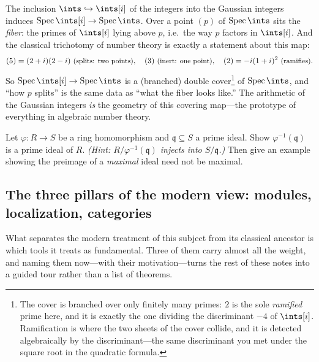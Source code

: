 \documentclass[11pt]{article}
\DeclareMathOperator{\Spec}{Spec}
\newcommand{\mfq}{\mathfrak{q}}
\begin{document}
\begin{eexample}
The inclusion $\ints\hookrightarrow\ints[i]$ of the integers into the Gaussian integers
induces $\Spec\ints[i]\to\Spec\ints$. Over a point $(p)$ of $\Spec\ints$ sits the
\emph{fiber}: the primes of $\ints[i]$ lying above $p$, i.e.\ the way $p$ factors in
$\ints[i]$. And the classical trichotomy of number theory is exactly a statement about this
map:
\[
(5)=(2+i)(2-i)\ \text{\small(splits: two points)},\quad
(3)\ \text{\small(inert: one point)},\quad
(2)=-i(1+i)^2\ \text{\small(ramifies)}.
\]
So $\Spec\ints[i]\to\Spec\ints$ is a (branched) double cover\footnote{The cover is branched
over only finitely many primes: $2$ is the sole \emph{ramified} prime here, and it is exactly
the one dividing the discriminant $-4$ of $\ints[i]$. Ramification is where the two sheets of
the cover collide, and it is detected algebraically by the discriminant---the same
discriminant you met under the square root in the quadratic formula.} of $\Spec\ints$, and
``how $p$ splits'' is the same data as ``what the fiber looks like.'' The arithmetic of the
Gaussian integers \emph{is} the geometry of this covering map---the prototype of everything
in algebraic number theory.
\end{eexample}

\begin{xca}
Let $\varphi\colon R\to S$ be a ring homomorphism and $\mfq\subseteq S$ a prime ideal. Show
$\varphi^{-1}(\mfq)$ is a prime ideal of $R$. \emph{(Hint: $R/\varphi^{-1}(\mfq)$ injects
into $S/\mfq$.)} Then give an example showing the preimage of a \emph{maximal} ideal need
not be maximal.
\end{xca}

\subsection{The three pillars of the modern view: modules, localization, categories}

What separates the modern treatment of this subject from its classical ancestor is which
tools it treats as fundamental. Three of them carry almost all the weight, and naming them
now---with their motivation---turns the rest of these notes into a guided tour rather than a
list of theorems.
\end{document}
